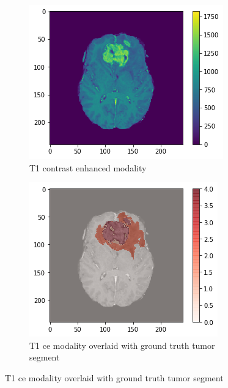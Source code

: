 \begin{figure}[H]
    \centering
    \begin{subfigure}{.33\textwidth}
        \centering
        \includegraphics[width=\linewidth]{chapters/07_brats3d/images/02_t1ce.png}
        \caption{T1 contrast enhanced modality}
    \end{subfigure}%
    \begin{subfigure}{.33\textwidth}
        \centering
        \includegraphics[width=\linewidth]{chapters/07_brats3d/images/06_t1ce_segment.png}
        \caption{T1 ce modality overlaid with ground truth tumor segment}

\end{subfigure}
\end{figure}
